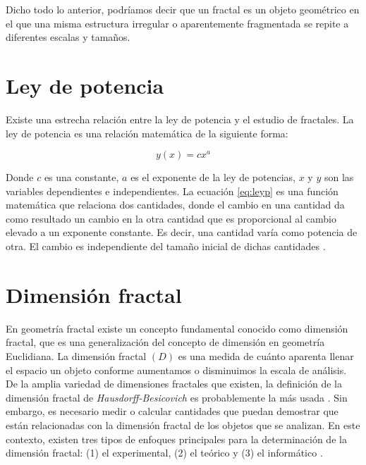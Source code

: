 Dicho todo lo anterior, podr\'{i}amos decir que un fractal es un objeto geom\'{e}trico en el que una misma estructura irregular o aparentemente fragmentada se repite a diferentes escalas y tamaños. 

\section{Ley de potencia} 
\label{sec:leypotencia}

Existe una estrecha relaci\'{o}n entre la ley de potencia y el estudio de fractales. La ley de potencia es una relaci\'{o}n matem\'{a}tica de la siguiente forma:

\begin{equation}
	y(x) = cx^{a}
	\label{eq:leyp}
\end{equation}

Donde $c$ es una constante, $a$ es el exponente de la ley de potencias, $x$ y $y$ son las variables dependientes e independientes. La ecuaci\'{o}n \ref{eq:leyp} es una funci\'{o}n matem\'{a}tica que relaciona dos cantidades, donde el cambio en una cantidad da como resultado un cambio en la otra cantidad que es proporcional al cambio elevado a un exponente constante. Es decir, una cantidad var\'{i}a como potencia de otra. El cambio es independiente del tamaño inicial de dichas cantidades \cite{Meakin1998}.


\section{Dimensi\'{o}n fractal}
\label{sec:dimensionf}

En geometr\'{i}a fractal existe un concepto fundamental conocido como dimensi\'{o}n fractal, que es una generalizaci\'{o}n del concepto de dimensi\'{o}n en geometr\'{i}a Euclidiana. La dimensi\'{o}n fractal $(D)$ es una medida de cu\'{a}nto aparenta llenar el espacio un objeto conforme aumentamos o disminuimos la escala de an\'{a}lisis. De la  amplia variedad de dimensiones fractales que existen, la definici\'{o}n de la dimensi\'{o}n fractal de \textit{Hausdorff-Besicovich} es probablemente la m\'{a}s usada \cite{Vicsek1992, Meakin1998}. Sin embargo, es necesario medir o calcular cantidades que puedan demostrar que est\'{a}n relacionadas con la dimensi\'{o}n fractal de los objetos que se analizan. En este contexto, existen  tres tipos de enfoques principales para la determinaci\'{o}n de la dimensi\'{o}n fractal: (1) el experimental, (2) el te\'{o}rico y (3) el inform\'{a}tico \cite{Vicsek1992}.

